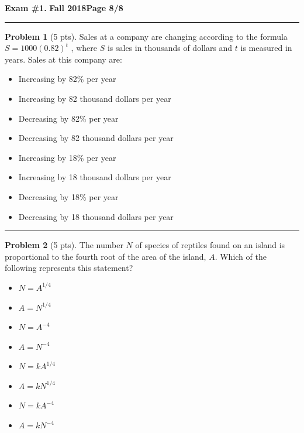 \documentclass[12pt]{article}
\makeatletter
\theoremstyle{definition}
\newtheorem{problem}{Problem}
\newcommand*{\radiobutton}{%
  \@ifstar{\@radiobutton0}{\@radiobutton1}%
}
\newcommand*{\@radiobutton}[1]{%
  \begin{tikzpicture}
    \pgfmathsetlengthmacro\radius{height("X")/2}
    \draw[radius=\radius] circle;
    \ifcase#1 \fill[radius=.6*\radius] circle;\fi
  \end{tikzpicture}%
}
\makeatother
\begin{document}
\hfill{\large\bf Exam \#1.}\hfill{\large\bf
  Fall 2018}\hfill{\large\bf Page 8/8}\hrule

\bigskip
\begin{problem}[5 pts]
Sales at a company are changing according to the formula $S = 1000 (0.82)^t$ , where $S$ is sales in thousands of dollars and $t$ is measured in years. Sales at this company are:
\begin{itemize}
\item[\radiobutton] Increasing by 82\% per year
\item[\radiobutton] Increasing by 82 thousand dollars per year
\item[\radiobutton] Decreasing by 82\% per year
\item[\radiobutton] Decreasing by 82 thousand dollars per year
\item[\radiobutton] Increasing by 18\% per year
\item[\radiobutton] Increasing by 18 thousand dollars per year
\item[\radiobutton] Decreasing by 18\% per year
\item[\radiobutton] Decreasing by 18 thousand dollars per year
\end{itemize} 
\end{problem}
\hrule

\begin{problem}[5 pts]
The number $N$ of species of reptiles found on an island is proportional to the fourth root of the area of the island, $A$.  Which of the following represents this statement?
\begin{itemize}
\item[\radiobutton] $N=A^{1/4}$
\item[\radiobutton] $A=N^{1/4}$
\item[\radiobutton] $N=A^{-4}$
\item[\radiobutton] $A=N^{-4}$
\item[\radiobutton] $N=kA^{1/4}$
\item[\radiobutton] $A=kN^{1/4}$
\item[\radiobutton] $N=kA^{-4}$
\item[\radiobutton] $A=kN^{-4}$
\end{itemize}
\end{problem}
\end{document}
